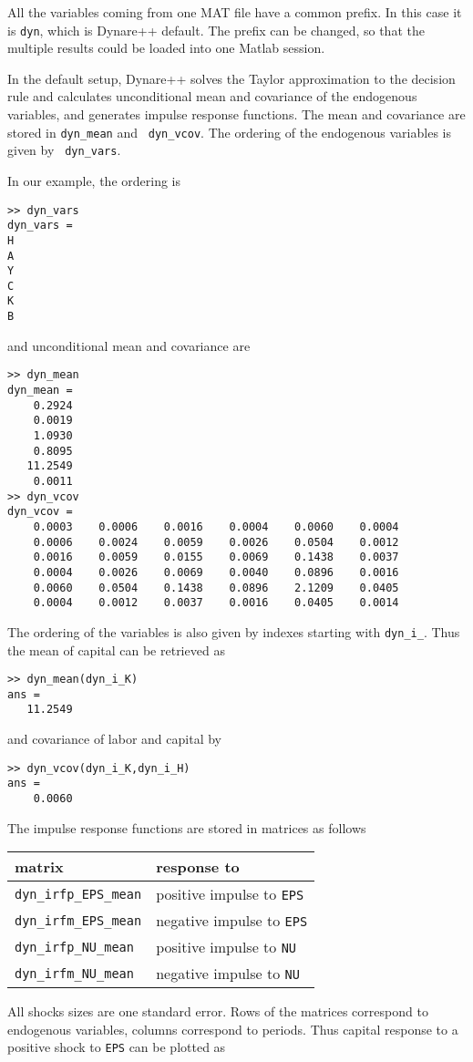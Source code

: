 \documentclass[10pt]{article}
\begin{document}
All the variables coming from one MAT file have a common prefix. In
this case it is {\tt dyn}, which is Dynare++ default. The prefix can
be changed, so that the multiple results could be loaded into one Matlab
session.

In the default setup, Dynare++ solves the Taylor approximation to the
decision rule and calculates unconditional mean and covariance of the
endogenous variables, and generates impulse response functions. The
mean and covariance are stored in {\tt dyn\_mean} and {\tt
dyn\_vcov}. The ordering of the endogenous variables is given by {\tt
dyn\_vars}.

In our example, the ordering is

{\small
\begin{verbatim}
>> dyn_vars
dyn_vars =
H
A
Y
C
K
B
\end{verbatim}
}

and unconditional mean and covariance are

{\small
\begin{verbatim}
>> dyn_mean
dyn_mean =
    0.2924
    0.0019
    1.0930
    0.8095
   11.2549
    0.0011
>> dyn_vcov
dyn_vcov =
    0.0003    0.0006    0.0016    0.0004    0.0060    0.0004
    0.0006    0.0024    0.0059    0.0026    0.0504    0.0012
    0.0016    0.0059    0.0155    0.0069    0.1438    0.0037
    0.0004    0.0026    0.0069    0.0040    0.0896    0.0016
    0.0060    0.0504    0.1438    0.0896    2.1209    0.0405
    0.0004    0.0012    0.0037    0.0016    0.0405    0.0014
\end{verbatim}
}

The ordering of the variables is also given by indexes starting with
{\tt dyn\_i\_}. Thus the mean of capital can be retrieved as

{\small
\begin{verbatim}
>> dyn_mean(dyn_i_K)
ans =
   11.2549
\end{verbatim}
}

\noindent and covariance of labor and capital by

{\small
\begin{verbatim}
>> dyn_vcov(dyn_i_K,dyn_i_H)
ans =
    0.0060
\end{verbatim}
}

The impulse response functions are stored in matrices as follows
\begin{center}
\begin{tabular}{|l|l|}
\hline
matrix& response to\\
\hline
{\tt dyn\_irfp\_EPS\_mean}& positive impulse to {\tt EPS}\\
{\tt dyn\_irfm\_EPS\_mean}& negative impulse to {\tt EPS}\\
{\tt dyn\_irfp\_NU\_mean}& positive impulse to {\tt NU}\\
{\tt dyn\_irfm\_NU\_mean}& negative impulse to {\tt NU}\\
\hline
\end{tabular}
\end{center}
All shocks sizes are one standard error. Rows of the matrices
correspond to endogenous variables, columns correspond to
periods. Thus capital response to a positive shock to {\tt EPS} can be
plotted as
\end{document}
